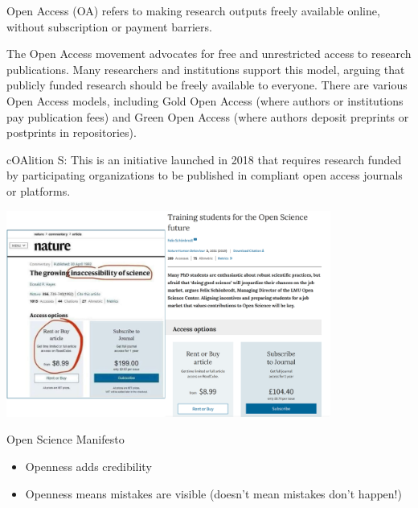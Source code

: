 \documentclass[
  ignorenonframetext,
  aspectratio=169,
]{beamer}
\providecommand{\tightlist}{%
  \setlength{\itemsep}{0pt}\setlength{\parskip}{0pt}}\usepackage{longtable,booktabs,array}
\begin{document}
\begin{frame}{}
\label{section-2}
Open Access (OA) refers to making research outputs freely available
online, without subscription or payment barriers.

The Open Access movement advocates for free and unrestricted access to
research publications. Many researchers and institutions support this
model, arguing that publicly funded research should be freely available
to everyone. There are various Open Access models, including Gold Open
Access (where authors or institutions pay publication fees) and Green
Open Access (where authors deposit preprints or postprints in
repositories).

cOAlition S: This is an initiative launched in 2018 that requires
research funded by participating organizations to be published in
compliant open access journals or platforms.
\end{frame}

\begin{frame}{}
\label{section-3}
\begin{center}
\includegraphics[width=0.8\textwidth,height=\textheight]{figs/paid-os.png}
\end{center}
\end{frame}

\begin{frame}{Open Science Manifesto}
\label{open-science-manifesto}
\begin{itemize}
\tightlist
\item
  Openness adds credibility
\item
  Openness means mistakes are visible (doesn't mean mistakes don't
  happen!)
\end{itemize}
\end{frame}
\end{document}
